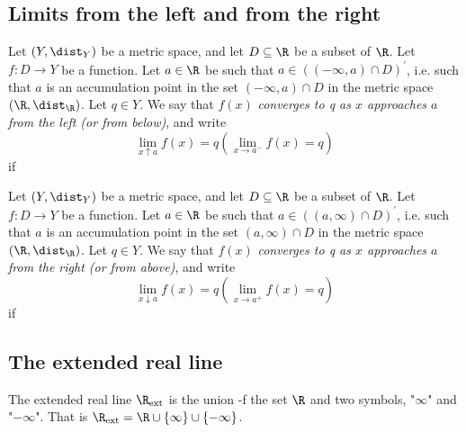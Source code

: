 \subsection{Limits from the left and from the right}
\begin{definition}
    Let $(Y,\dist_Y)$ be a metric space, and let $D \subseteq \R$ be a subset of $\R$. Let $f: D \to Y$ be a function.
    Let $a \in \R$ be such that $a \in ((-\infty,a)\cap D)^\prime$, i.e. such that $a$ is an accumulation point in the set
    $(-\infty,a) \cap D$ in the metric space $(\R, \dist_\R)$. Let $q \in Y$. We say that $f(x)$ \emph{converges to q as
    $x$ approaches $a$ from the left (or from below)}, and write
    $$\lim_{x\uparrow a}f(x) = q (\lim_{x\to a^-}f(x)=q)$$
    if
    \begin{myCenter}
    \end{myCenter}
\end{definition}
\begin{definition}
    Let $(Y,\dist_Y)$ be a metric space, and let $D \subseteq \R$ be a subset of $\R$. Let $f: D \to Y$ be a function.
    Let $a \in \R$ be such that $a \in ((a,\infty)\cap D)^\prime$, i.e. such that $a$ is an accumulation point in the set
    $(a,\infty) \cap D$ in the metric space $(\R, \dist_\R)$. Let $q \in Y$. We say that $f(x)$ \emph{converges to q as
    $x$ approaches $a$ from the right (or from above)}, and write
    $$\lim_{x\downarrow a}f(x) = q (\lim_{x\to a^+}f(x)=q)$$
    if
    \begin{myCenter}
    \end{myCenter}
\end{definition}

\subsection{The extended real line}
\begin{definition}
    The extended real line $\R_\text{ext}$ is the union -f the set $\R$ and two symbols, "$\infty$" and "$-\infty$".
    That is $\R_\text{ext} = \R \cup \{\infty\} \cup \{-\infty\}$.
\end{definition}

